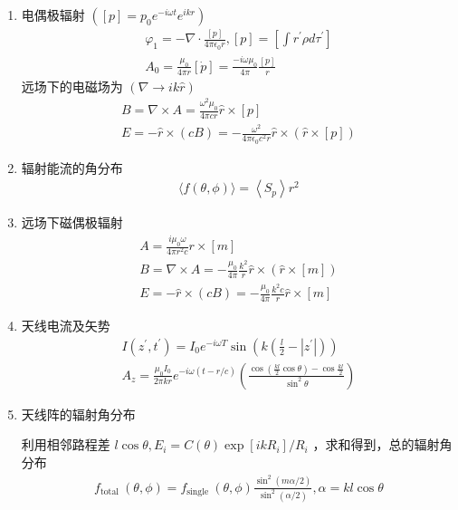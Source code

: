 \documentclass[../../note.tex]{subfiles}
\begin{document}
\begin{enumerate}
	\item 电偶极辐射 $\left([p]=p_0 e^{-i \omega t} e^{i k r}\right)$
	\begin{align}
		\varphi_1=-\nabla \cdot \frac{[p]}{4 \pi \epsilon_0 r},[p]=\left[\int r^{\prime} \rho d \tau^{\prime}\right] \\
		A_0=\frac{\mu_0}{4 \pi r}[\dot{p}]=\frac{-i \omega \mu_0}{4 \pi} \frac{[p]}{r}
	\end{align}
	远场下的电磁场为 $(\nabla \rightarrow i k \hat{r})$
	\begin{align}
		B=\nabla \times {A}=\frac{\omega^2 \mu_0}{4 \pi c r} \hat{r} \times[p] \\
		{E}=-\hat{r} \times(c {B})=-\frac{\omega^2}{4 \pi \epsilon_0 c^2 r} \hat{r} \times(\hat{r} \times[p])
	\end{align}
	\item 辐射能流的角分布
\begin{align}
	\langle f(\theta, \phi)\rangle=\left\langle{S}_p\right\rangle r^2
\end{align}
	\item 远场下磁偶极辐射
	\begin{align}
		{A}=\frac{i \mu_0 \omega}{4 \pi r^2 c} {r} \times[m] \\
		{B}=\nabla \times {A}=-\frac{\mu_0}{4 \pi} \frac{k^2}{r} \hat{r} \times(\hat{r} \times[m]) \\
		{E}=-\hat{r} \times(c {B})=-\frac{\mu_0}{4 \pi} \frac{k^2 c}{r} \hat{r} \times[m]
	\end{align}
	\item 天线电流及矢势
	\begin{align}
		I\left(z^{\prime}, t^{\prime}\right)=I_0 e^{-i \omega T} \sin \left(k\left(\frac{l}{2}-\left|z^{\prime}\right|\right)\right) \\
		A_z=\frac{\mu_0 I_0}{2 \pi k r} e^{-i \omega(t-r / c)}\left(\frac{\cos \left(\frac{k l}{2} \cos \theta\right)-\cos \frac{k l}{2}}{\sin ^2 \theta}\right)
	\end{align}
	\item 天线阵的辐射角分布
	
	利用相邻路程差 $l \cos \theta, {E}_i=C(\theta) \exp \left[i k R_i\right] / R_i$ ，求和得到，总的辐射角分布
\begin{align}
	f_{\text {total }}(\theta, \phi)=f_{\text {single }}(\theta, \phi) \frac{\sin ^2(m \alpha / 2)}{\sin ^2(\alpha / 2)}, \alpha=k l \cos \theta
\end{align}
\end{enumerate}
\end{document}
